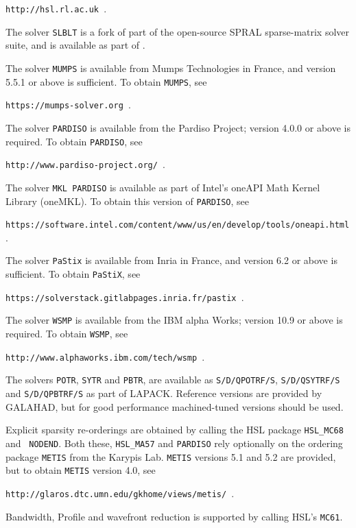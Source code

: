 \documentclass{galahad}
\begin{document}
{\tt http://hsl.rl.ac.uk }.

\noindent
The solver {\tt SLBLT} is a fork of part of the open-source SPRAL sparse-matrix
solver suite, and is available as part of \galahad.
%

\noindent
The solver {\tt MUMPS} is available from Mumps Technologies in France, and 
version 5.5.1 or above is sufficient.
To obtain {\tt MUMPS}, see

{\tt https://mumps-solver.org }.

\noindent
The solver {\tt PARDISO} is available from the Pardiso Project;
version 4.0.0 or above is required.
To obtain {\tt PARDISO}, see

{\tt http://www.pardiso-project.org/ }.

\noindent
The solver {\tt MKL PARDISO} is available as part of Intel's oneAPI Math Kernel
Library (oneMKL).
To obtain this version of {\tt PARDISO}, see

{\tt https://software.intel.com/content/www/us/en/develop/tools/oneapi.html }.

\noindent
The solver {\tt PaStix} is available from Inria in France, and 
version 6.2 or above is sufficient.
To obtain {\tt PaStiX}, see

{\tt https://solverstack.gitlabpages.inria.fr/pastix }.

\noindent
The solver {\tt WSMP} is available from the IBM alpha Works;
version 10.9 or above is required.
To obtain {\tt WSMP}, see

{\tt http://www.alphaworks.ibm.com/tech/wsmp }.

\noindent
The solvers {\tt POTR}, {\tt SYTR} and {\tt PBTR},
are available as
{\tt S/D/QPOTRF/S},
{\tt S/D/QSYTRF/S} and {\tt S/D/QPBTRF/S}
as part of LAPACK. Reference versions
are provided by GALAHAD, but for good performance
machined-tuned versions should be used.

\noindent
Explicit sparsity re-orderings are obtained by calling the HSL package
{\tt HSL\_MC68} and \galahads\ {\tt NODEND}.
Both these, {\tt HSL\_MA57} and {\tt PARDISO} rely optionally
on the ordering package {\tt METIS} from the Karypis Lab. {\tt METIS}
versions 5.1 and 5.2 are provided, but to obtain
{\tt METIS} version 4.0, see

{\tt http://glaros.dtc.umn.edu/gkhome/views/metis/ }.

\noindent
Bandwidth, Profile and wavefront reduction is supported by
calling HSL's {\tt MC61}.
\end{document}
